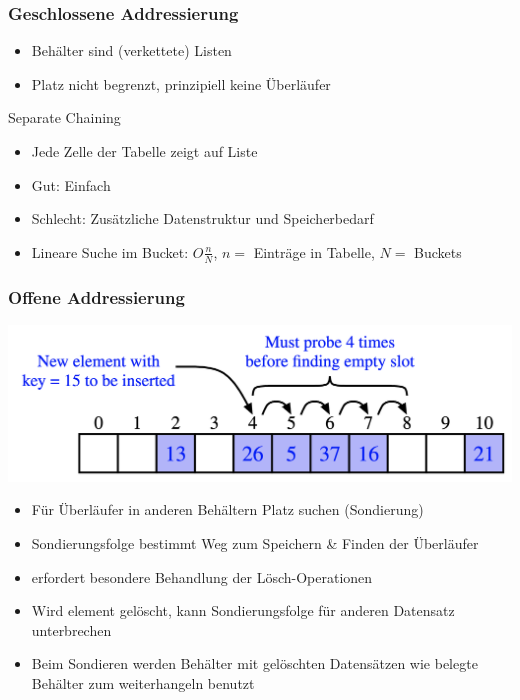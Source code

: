 \documentclass[a4paper, landscape, 8pt]{scrartcl}
\begin{document}
\begin{multicols*}{4}
                \subsubsection{Geschlossene Addressierung}
                    \begin{itemize}
                        \item Behälter sind (verkettete) Listen
                        \item Platz nicht begrenzt, prinzipiell keine Überläufer
                    \end{itemize}
                    \textcolor{subsectioncolor}{Separate Chaining}
                    \begin{itemize}
                        \item Jede Zelle der Tabelle zeigt auf Liste
                        \item Gut: Einfach
                        \item Schlecht: Zusätzliche Datenstruktur und Speicherbedarf
                        \item Lineare Suche im Bucket: $O\frac{n}{N}$, $n =$ Einträge in Tabelle, $N =$ Buckets
                    \end{itemize}

                \subsubsection{Offene Addressierung}
                    \includegraphics[scale=0.15]{graphic/17_hashing_offene_addressierung}
                    \begin{itemize}
                        \item Für Überläufer in anderen Behältern Platz suchen (Sondierung)
                        \item Sondierungsfolge bestimmt Weg zum Speichern \& Finden der Überläufer
                        \item erfordert besondere Behandlung der Lösch-Operationen
                        \item Wird element gelöscht, kann Sondierungsfolge für anderen Datensatz unterbrechen
                        \item Beim Sondieren werden Behälter mit gelöschten Datensätzen wie belegte Behälter zum
                        weiterhangeln benutzt
                    \end{itemize}
        

\end{multicols*}
\end{document}
